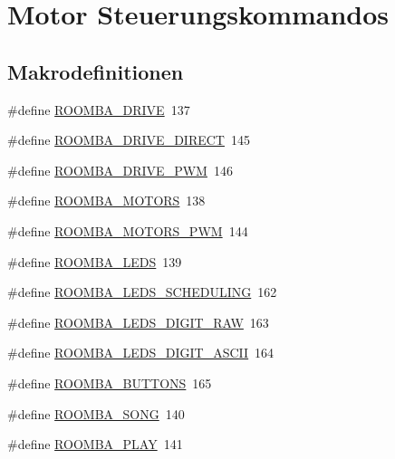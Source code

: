 \hypertarget{group__roomba__commands__motor}{\section{Motor Steuerungskommandos}
\label{group__roomba__commands__motor}
}
\subsection*{Makrodefinitionen}
\begin{DoxyCompactItemize}
\item 
\#define \hyperlink{group__roomba__commands__motor_gacf921626edb00b06fbdf86312d8c7341}{R\-O\-O\-M\-B\-A\-\_\-\-D\-R\-I\-V\-E}~137
\item 
\#define \hyperlink{group__roomba__commands__motor_ga26e08e4c9584dfc518700fd299eddc96}{R\-O\-O\-M\-B\-A\-\_\-\-D\-R\-I\-V\-E\-\_\-\-D\-I\-R\-E\-C\-T}~145
\item 
\#define \hyperlink{group__roomba__commands__motor_ga513cf01360599037868593fc9525bd6e}{R\-O\-O\-M\-B\-A\-\_\-\-D\-R\-I\-V\-E\-\_\-\-P\-W\-M}~146
\item 
\#define \hyperlink{group__roomba__commands__motor_gadf0186e2adef9b3aa86daf2deb35e0ff}{R\-O\-O\-M\-B\-A\-\_\-\-M\-O\-T\-O\-R\-S}~138
\item 
\#define \hyperlink{group__roomba__commands__motor_ga7fba3d9876ee967f6bbefc85a05e8fed}{R\-O\-O\-M\-B\-A\-\_\-\-M\-O\-T\-O\-R\-S\-\_\-\-P\-W\-M}~144
\item 
\#define \hyperlink{group__roomba__commands__motor_gab8173cfeebe0443357775116393d5964}{R\-O\-O\-M\-B\-A\-\_\-\-L\-E\-D\-S}~139
\item 
\#define \hyperlink{group__roomba__commands__motor_ga9c8923fd04b3275a57ca487f34990743}{R\-O\-O\-M\-B\-A\-\_\-\-L\-E\-D\-S\-\_\-\-S\-C\-H\-E\-D\-U\-L\-I\-N\-G}~162
\item 
\#define \hyperlink{group__roomba__commands__motor_ga1ea5e809eb83d4bf5dd6a6f33dabffae}{R\-O\-O\-M\-B\-A\-\_\-\-L\-E\-D\-S\-\_\-\-D\-I\-G\-I\-T\-\_\-\-R\-A\-W}~163
\item 
\#define \hyperlink{group__roomba__commands__motor_ga72bfc393689d5c9aa839df84e21888f7}{R\-O\-O\-M\-B\-A\-\_\-\-L\-E\-D\-S\-\_\-\-D\-I\-G\-I\-T\-\_\-\-A\-S\-C\-I\-I}~164
\item 
\#define \hyperlink{group__roomba__commands__motor_ga57cbce423408ed2ed3595f504ec300cb}{R\-O\-O\-M\-B\-A\-\_\-\-B\-U\-T\-T\-O\-N\-S}~165
\item 
\#define \hyperlink{group__roomba__commands__motor_gade5b4a0d2f24f3f551bf43aedbf6e653}{R\-O\-O\-M\-B\-A\-\_\-\-S\-O\-N\-G}~140
\item 
\#define \hyperlink{group__roomba__commands__motor_ga47c9ccefb9e9e34108cc37339ae60f58}{R\-O\-O\-M\-B\-A\-\_\-\-P\-L\-A\-Y}~141
\end{DoxyCompactItemize}


